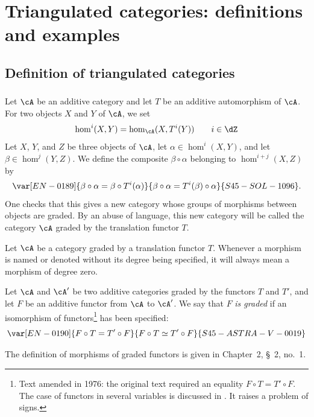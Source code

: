 \section{Triangulated categories: definitions and examples}\label{VIII:1}

\subsection{Definition of triangulated categories}\label{VIII:1-1}

\addtocounter{subsubsection}{-1}
\subsubsection{}\label{VIII:1-1-0}

Let $\cA$ be an additive category and let $T$ be an additive automorphism of
$\cA$. For two objects $X$ and $Y$ of $\cA$, we set
\[
  \hom^i(X,Y) = \hom_\cA(X,T^i(Y)) \qquad i\in \dZ
\]
Let $X$, $Y$, and $Z$ be three objects of $\cA$, let
$\alpha\in \hom^i(X,Y)$, and let $\beta\in \hom^j(Y,Z)$. We define the
composite $\beta\circ\alpha$ belonging to $\hom^{i+j}(X,Z)$ by
\[
  \var[EN-0189]{\beta\circ \alpha = \beta\circ T^i(\alpha)}{\beta\circ \alpha = T^i(\beta)\circ\alpha}{S45-SOL-1096} \text{.}
\]
One checks that this gives a new category whose groups of morphisms between
objects are graded. By an abuse of language, this new category will be called
the category $\cA$ graded by the translation functor $T$.

Let $\cA$ be a category graded by a translation functor $T$. Whenever a
morphism is named or denoted without its degree being specified, it will
always mean a morphism of degree zero.

Let $\cA$ and $\cA'$ be two additive categories graded by the functors $T$
and $T'$, and let $F$ be an additive functor from $\cA$ to $\cA'$. We say
that $F$ \emph{is graded} if an isomorphism of
functors\footnote{Text amended in 1976: the original text required an
equality $F\circ T=T'\circ F$. The case of functors in several variables is
discussed in . It raises a problem of signs.}
has been specified:
\[
  \var[EN-0190]{F\circ T = T'\circ F}{F\circ T \simeq T'\circ F}{S45-ASTRA-V-0019}
\]

The definition of morphisms of graded functors is given in
Chapter~2, \S~2, no.~1.

